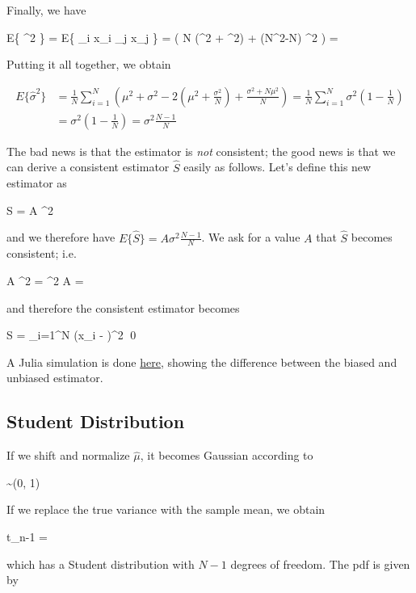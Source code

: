 Finally, we have

\bee
E\left\{ \hat\mu^2 \right\} = E\left\{  \sum_i x_i \sum_j x_j \right\} =  \left( N (\mu^2 + \sigma^2) + (N^2-N) \mu^2 \right) = 
\eee

Putting it all together, we obtain

\begin{align*}
E\{\hat\sigma^2\} &= \frac{1}{N} \sum_{i=1}^N \left( \mu^2 + \sigma^2 - 2 \left( \mu^2 + \frac{\sigma^2}{N} \right) + \frac{\sigma^2 + N \mu^2}{N} \right) = \frac{1}{N} \sum_{i=1}^N \sigma^2 \left(1 - \frac{1}{N} \right) \\ &= \sigma^2 \left(1 - \frac{1}{N} \right) = \sigma^2 \frac{N-1}{N}
\end{align*}

The bad news is that the estimator is \emph{not} consistent; the good news is that we can derive a consistent estimator $\hat S$ easily as follows. Let's define this new estimator as

\bee
\hat S = A \hat \sigma^2
\eee

and we therefore have $E\{\hat S\} = A \sigma^2 \frac{N-1}{N}$. We ask for a value $A$ that $\hat S$ becomes consistent; i.e.

\bee
A \sigma^2  = \sigma^2 \rightarrow A = 
\eee

and therefore the consistent estimator becomes

\bee
\hat S =  \sum_{i=1}^N (x_i - \hat\mu)^2 \qed
\eee

A Julia simulation is done \href{https://github.com/ClemensFMN/JuliaStuff/blob/master/stochastic/student_0.jl}{here}, showing the difference between the biased and unbiased estimator.


\subsection{Student Distribution}

If we shift and normalize $\hat \mu$, it becomes Gaussian according to

\bee
{} \sim \Nc(0, 1)
\eee

If we replace the true variance with the sample mean, we obtain

\bee
t_{n-1} = 
\eee

which has a Student distribution with $N-1$ degrees of freedom. The pdf is given by


